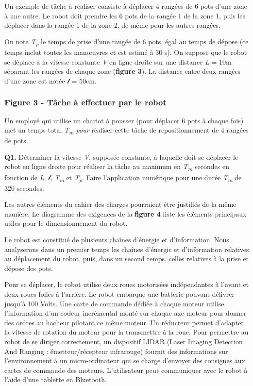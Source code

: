 \documentclass[
]{article}
\begin{document}
Un exemple de tâche à réaliser consiste à déplacer 4 rangées de 6 pots
d'une zone à une autre. Le robot doit prendre les 6 pots de la rangée 1
de la zone 1, puis les déplacer dans la rangée 1 de la zone 2, de même
pour les autres rangées.

On note \emph{T\textsubscript{p }}le temps de prise d'une rangée de 6
pots, égal au temps de dépose (ce temps inclut toutes les manœuvres et
est estimé à 30 s). On suppose que le robot se déplace à la vitesse
constante \emph{V} en ligne droite sur une distance \emph{L} = 10m
séparant les rangées de chaque zone (\textbf{figure 3}). La distance
entre deux rangées d'une zone est notée \(\mathcal{l}\) = 50cm.

\hypertarget{figure-3---tuxe2che-uxe0-effectuer-par-le-robot}{%
\subsubsection{\texorpdfstring{\textbf{Figure 3 -} Tâche à effectuer par
le
robot}{Figure 3 - Tâche à effectuer par le robot}}\label{figure-3---tuxe2che-uxe0-effectuer-par-le-robot}}

Un employé qui utilise un chariot à pousser (pour déplacer 6 pots à
chaque fois) met un temps total \emph{T\textsubscript{m} pour} réaliser
cette tâche de repositionnement de 4 rangées de pots.

\textbf{Q1.} Déterminer la vitesse \emph{V}, supposée constante, à
laquelle doit se déplacer le robot en ligne droite pour réaliser la
tâche au maximum en \emph{T\textsubscript{m }}secondes en fonction de
\emph{L}, \(\mathcal{l}\), \emph{T\textsubscript{m }}et
\emph{T\textsubscript{p}}. Faire l'application numérique pour une durée
\emph{T\textsubscript{m }}de 320 secondes.

Les autres éléments du cahier des charges pourraient être justifiés de
la même manière. Le diagramme des exigences de la \textbf{figure 4}
liste les éléments principaux utiles pour le dimensionnement du robot.

Le robot est constitué de plusieurs chaînes d'énergie et d'information.
Nous analyserons dans un premier temps les chaînes d'énergie et
d'information relatives au déplacement du robot, puis, dans un second
temps, celles relatives à la prise et dépose des pots.

Pour se déplacer, le robot utilise deux roues motorisées indépendantes à
l'avant et deux roues folles à l'arrière. Le robot embarque une batterie
pouvant délivrer jusqu'à 100 Volts. Une carte de commande dédiée à
chaque moteur utilise l'information d'un codeur incrémental monté sur
chaque axe moteur pour donner des ordres au hacheur pilotant ce même
moteur. Un réducteur permet d'adapter la vitesse de rotation du moteur
pour la transmettre à la roue. Pour permettre au robot de se diriger
correctement, un dispositif LIDAR (Laser Imaging Detection And Ranging :
émetteur/récepteur infrarouge) fournit des informations sur
l'environnement à un micro-ordinateur qui se charge d'envoyer des
consignes aux cartes de commande des moteurs. L'utilisateur peut
communiquer avec le robot à l'aide d'une tablette en Bluetooth.
\end{document}
